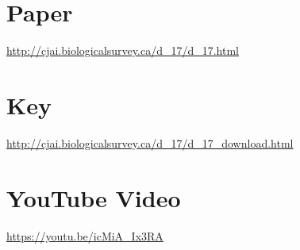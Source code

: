 \documentclass[]{article}
\begin{document}
\section*{Paper}

\url{http://cjai.biologicalsurvey.ca/d_17/d_17.html}


\section*{Key}

\url{http://cjai.biologicalsurvey.ca/d_17/d_17_download.html}

\section*{YouTube Video}

\url{https://youtu.be/icMiA_Ix3RA}
\end{document}
